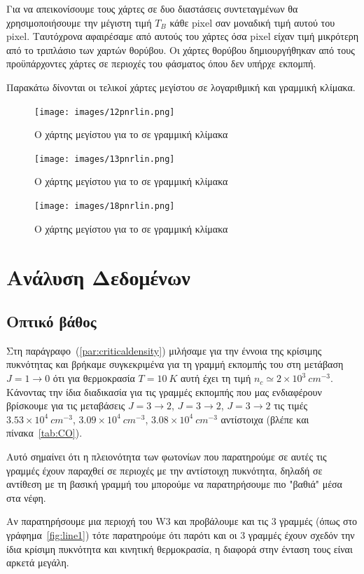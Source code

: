 \documentclass[a4paper,12pt]{memoir}
\newcommand{\e}[1]{\times 10^{#1}}
\begin{document}
Για να απεικονίσουμε τους χάρτες σε δυο διαστάσεις συντεταγμένων θα χρησιμοποιήσουμε την μέγιστη
 τιμή $T_B$ κάθε pixel σαν μοναδική τιμή αυτού του pixel. Ταυτόχρονα αφαιρέσαμε από αυτούς του χάρτες όσα pixel είχαν τιμή μικρότερη από το τριπλάσιο των χαρτών θορύβου.
 Οι χάρτες θορύβου δημιουργήθηκαν από τους προϋπάρχοντες χάρτες σε περιοχές του φάσματος όπου δεν υπήρχε εκπομπή. 

Παρακάτω δίνονται οι τελικοί χάρτες μεγίστου σε λογαριθμική και γραμμική κλίμακα.

\begin{figure}[hb]

	\centering
	\texttt{[image: images/12pnrlin.png]}
	\caption{Ο χάρτης μεγίστου για το  σε γραμμική κλίμακα}
		\centering
		\texttt{[image: images/13pnrlin.png]}
		\caption{Ο χάρτης μεγίστου για το  σε γραμμική κλίμακα}
\end{figure}


\begin{figure}[hb]
	\centering
	\texttt{[image: images/18pnrlin.png]}
	\caption{Ο χάρτης μεγίστου για το  σε γραμμική κλίμακα}
\end{figure}

\chapter{Ανάλυση Δεδομένων}

\section{Οπτικό βάθος}
\label{par:od}
Στη παράγραφο~(\ref{par:criticaldensity}) μιλήσαμε για την έννοια της κρίσιμης πυκνότητας και βρήκαμε συγκεκριμένα για τη γραμμή εκπομπής του  στη μετάβαση $J=1\to 0$ ότι για θερμοκρασία $T=10\ K$ αυτή έχει τη τιμή $n_c \simeq 2\e{3} \ cm^{-3}$. 
Κάνοντας την ίδια διαδικασία για τις γραμμές εκπομπής που μας ενδιαφέρουν βρίσκουμε για τις μεταβάσεις  $J=3\to 2$,  $J=3\to 2$,  $J=3\to 2$ τις τιμές $3.53\e{4}\ cm^{-3}$, $3.09\e{4}\ cm^{-3}$, $3.08\e{4}\ cm^{-3}$ αντίστοιχα (βλέπε και πίνακα~\ref{tab:CO}).

Αυτό σημαίνει ότι η πλειονότητα των φωτονίων που παρατηρούμε σε αυτές τις γραμμές έχουν παραχθεί σε περιοχές με την αντίστοιχη πυκνότητα, δηλαδή σε αντίθεση με τη βασική γραμμή του  μπορούμε να παρατηρήσουμε πιο "βαθιά" μέσα στα νέφη.

Αν παρατηρήσουμε μια περιοχή του W3 και προβάλουμε και τις 3 γραμμές (όπως στο γράφημα~\ref{fig:line1}) τότε παρατηρούμε ότι παρότι και οι 3 γραμμές έχουν σχεδόν την ίδια κρίσιμη πυκνότητα και κινητική θερμοκρασία, η διαφορά στην ένταση τους είναι αρκετά μεγάλη. 
\end{document}
